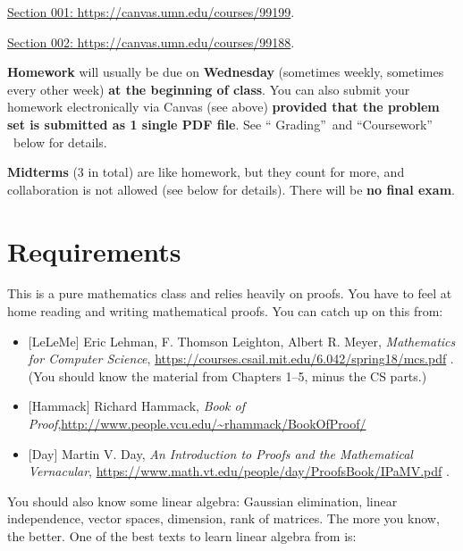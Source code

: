 \documentclass[numbers=enddot,12pt,final,onecolumn,notitlepage]{scrartcl}%
\theoremstyle{definition}
\begin{document}
\qquad\href{https://canvas.umn.edu/courses/99199}{Section 001:
https://canvas.umn.edu/courses/99199}.

\qquad\href{Section 002: https://canvas.umn.edu/courses/99188}{Section 002:
https://canvas.umn.edu/courses/99188}.

\bigskip

\textbf{Homework} will usually be due on \textbf{Wednesday} (sometimes weekly,
sometimes every other week) \textbf{at the beginning of class}. You can also
submit your homework electronically via Canvas (see above) \textbf{provided
that the problem set is submitted as 1 single PDF file}. See \textquotedblleft
Grading\textquotedblright\ and \textquotedblleft Coursework\textquotedblright%
\ below for details.

\bigskip

\textbf{Midterms} (3 in total) are like homework, but they count for more, and
collaboration is not allowed (see below for details). There will be \textbf{no
final exam}.

\section{Requirements}

This is a pure mathematics class and relies heavily on proofs. You have to
feel at home reading and writing mathematical proofs. You can catch up on this from:

\begin{itemize}
\item {}[LeLeMe] Eric Lehman, F. Thomson Leighton, Albert R. Meyer,
\textit{Mathematics for Computer Science}, \newline%
\url{https://courses.csail.mit.edu/6.042/spring18/mcs.pdf} . (You should know
the material from Chapters 1--5, minus the CS parts.)

\item {}[Hammack] Richard Hammack, \textit{Book of Proof},\newline\url{http://www.people.vcu.edu/~rhammack/BookOfProof/}

\item {}[Day] Martin V. Day, \textit{An Introduction to Proofs and the
Mathematical Vernacular},\newline%
\url{https://www.math.vt.edu/people/day/ProofsBook/IPaMV.pdf} .
\end{itemize}

You should also know some linear algebra: Gaussian elimination, linear
independence, vector spaces, dimension, rank of matrices. The more you know,
the better. One of the best texts to learn linear algebra from is:
\end{document}
